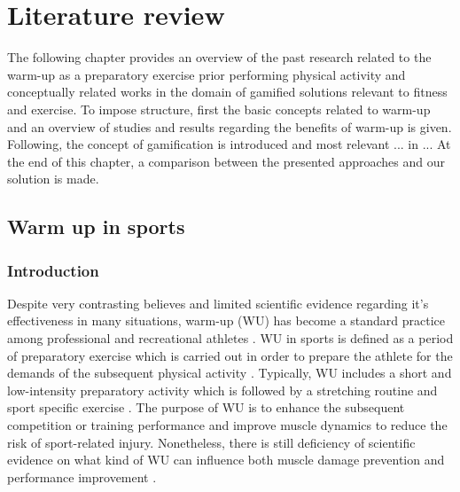 \chapter{Literature review}\label{chapter:warmup}

The following chapter provides an overview of the past research related to the warm-up as a preparatory exercise prior performing physical activity and conceptually related works in the domain of gamified solutions relevant to fitness and exercise. To impose structure, first the basic concepts related to warm-up and an overview of studies and results regarding the benefits of warm-up is given. Following, the concept of gamification is introduced and most relevant ... in ... At the end of this chapter, a comparison between the presented approaches and our solution is made.
\section{Warm up in sports}
\subsection{Introduction}
Despite very contrasting believes and limited scientific evidence regarding it's effectiveness in many situations, warm-up (WU) has become a standard practice among professional and
recreational athletes \cite{bishop2003warm1, bishop2003warm2, shellock1985warming}. WU in sports is defined as a period of preparatory exercise which is carried out in order to prepare the athlete for the demands of the subsequent physical activity \cite{karvonen1992importance, woods2007warm, hedrick1992exercise}.
Typically, WU includes a short and low-intensity preparatory activity which is followed by a stretching routine and sport specific exercise \cite{safran1989warm}. 
The purpose of WU is to enhance the subsequent competition or training performance and improve muscle dynamics to reduce the risk of sport-related injury\cite{bishop2003warm1, shellock1985warming, knudson2008warm}. 
Nonetheless, there is still deficiency of scientific evidence on what kind of WU can influence both muscle damage prevention and performance improvement \cite{safran1989warm}.\\ %
